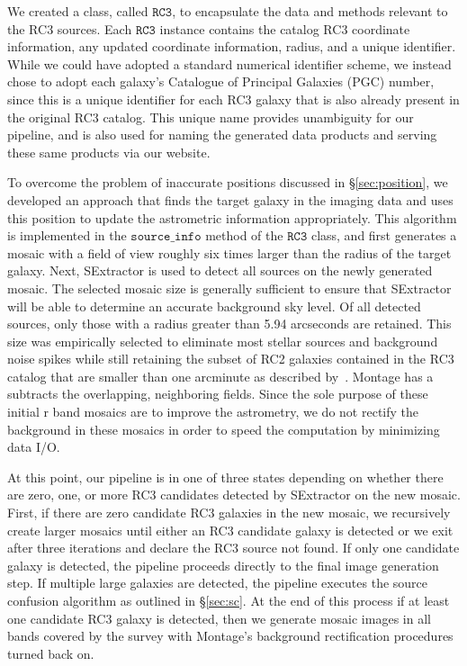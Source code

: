 \documentclass[authoryear, 12pt, 5p, times]{elsarticle}
\begin{document}
We created a class, called $\texttt{RC3}$, to encapsulate the data and methods relevant to the RC3 sources. Each $\texttt{RC3}$ instance contains the catalog RC3 coordinate information, any updated coordinate information, radius, and a unique identifier. While we could have adopted a standard numerical identifier scheme, we instead chose to adopt each galaxy's Catalogue of Principal Galaxies (PGC) number, since this is a unique identifier for each RC3 galaxy that is also already present in the original RC3 catalog. This unique name provides unambiguity for our pipeline, and is also used for naming the generated data products and serving these same products via our website.

To overcome the problem of inaccurate positions discussed in \S\ref{sec:position}, we developed an approach that finds the target galaxy in the imaging data and uses this position to update the astrometric information appropriately. This algorithm is implemented in the $\texttt{source\_info}$ method of the $\texttt{RC3}$ class, and first generates a mosaic with a field of view roughly six times larger than the radius of the target galaxy.  Next, SExtractor is used to detect all sources on the newly generated mosaic. The selected mosaic size is generally sufficient to ensure that SExtractor will be able to determine an accurate background sky level. Of all detected sources, only those with a radius greater than 5.94 arcseconds are retained. This size was empirically selected to eliminate most stellar sources and background noise spikes while still retaining the subset of RC2 galaxies contained in the RC3 catalog that are smaller than one arcminute as described by~\citealp{rc2}. Montage has a subtracts the overlapping, neighboring fields. Since the sole purpose of these initial r band mosaics are to improve the astrometry, we do not rectify the background in these mosaics in order to speed the computation by minimizing data I/O.

At this point, our pipeline is in one of three states depending on whether there are zero, one, or more RC3 candidates detected by SExtractor on the new mosaic. First, if there are zero candidate RC3 galaxies in the new mosaic, we recursively create larger mosaics until either an RC3 candidate galaxy is detected or we exit after three iterations and declare the RC3 source not found. If only one candidate galaxy is detected, the pipeline proceeds directly to the final image generation step. If multiple large galaxies are detected, the pipeline executes the source confusion algorithm as outlined in \S\ref{sec:sc}. At the end of this process if at least one candidate RC3 galaxy is detected, then we generate mosaic images in all bands covered by the survey with Montage's background rectification procedures turned back on.
\end{document}
